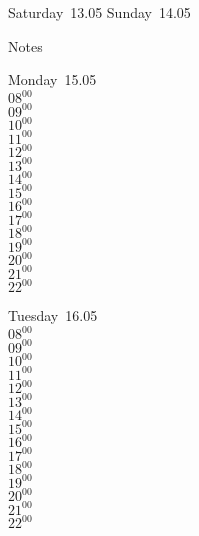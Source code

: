 \documentclass[11pt,a4paper]{book}\usepackage[]{graphicx}\usepackage[]{color}
\begin{document}
\begin{weekendbox}
  Saturday~13.05
  \tcblower
  Sunday~14.05
\end{weekendbox} %
\begin{notebox}
  Notes
\end{notebox}
\clearpage
\begin{headerbox}
\end{headerbox}
\begin{weekdaybox}
  Monday~15.05\\
  { 
  \vfill
  $08^{00}$\\
$09^{00}$\\
$10^{00}$\\
$11^{00}$\\
$12^{00}$\\
$13^{00}$\\
$14^{00}$\\
$15^{00}$\\
$16^{00}$\\
$17^{00}$\\
$18^{00}$\\
$19^{00}$\\
$20^{00}$\\
$21^{00}$\\
$22^{00}$\\
  }
\end{weekdaybox}
\begin{weekdaybox}
  Tuesday~16.05\\
  { 
  \vfill
  $08^{00}$\\
$09^{00}$\\
$10^{00}$\\
$11^{00}$\\
$12^{00}$\\
$13^{00}$\\
$14^{00}$\\
$15^{00}$\\
$16^{00}$\\
$17^{00}$\\
$18^{00}$\\
$19^{00}$\\
$20^{00}$\\
$21^{00}$\\
$22^{00}$\\
  }
\end{weekdaybox}
\end{document}

